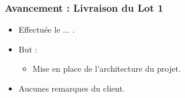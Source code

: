 \speaker{\Kafui}
\begin{frame}
  \frametitle{Avancement : Livraison du Lot 1}
  \begin{itemize}
    \item Effectuée le ... .
    \item But : 
    		\begin{itemize}
    		\item Mise en place de l'architecture du projet.
    		\end{itemize}
    	\item Aucunes remarques du client.
  \end{itemize}
\end{frame}
